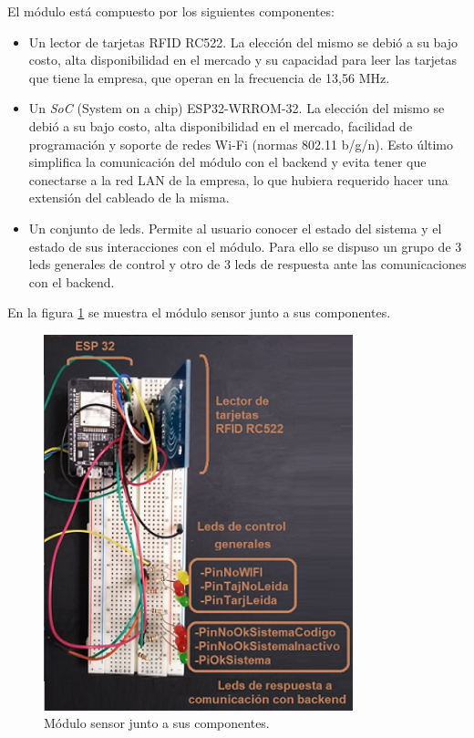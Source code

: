El módulo está compuesto por los siguientes componentes:

\begin{itemize}
\item Un lector de tarjetas RFID RC522. La elección del mismo se debió a su bajo costo, alta disponibilidad en el mercado y su capacidad para leer las tarjetas que tiene la empresa, que operan en la frecuencia de 13,56 MHz.
\item Un \textit{SoC} (System on a chip) ESP32-WRROM-32. La elección del mismo se debió a su bajo costo, alta disponibilidad en el mercado, facilidad de programación y soporte de redes Wi-Fi (normas 802.11 b/g/n). Esto último simplifica la comunicación del módulo con el backend y evita tener que conectarse a la red LAN de la empresa, lo que hubiera requerido hacer una extensión del cableado de la misma.
\item Un conjunto de leds. Permite al usuario conocer el estado del sistema y el estado de sus interacciones con el módulo. Para ello se dispuso un grupo de 3 leds generales de control y otro de 3 leds de respuesta ante las comunicaciones con el backend.

\end{itemize}

En la figura \ref{fig:moduloSensor} se muestra el módulo sensor junto a sus componentes.

\begin{figure}[ht]
	\centering
	\includegraphics[width=0.8\textwidth]{./Figures/moduloSensor.png}
	\caption{Módulo sensor junto a sus componentes.}
	\label{fig:moduloSensor}
\end{figure}

